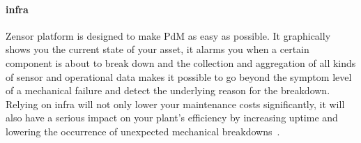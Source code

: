 \paragraph{\ac{infra}} 
Zensor platform is designed to make \ac{PdM} as easy as possible. It graphically shows you the current state of your asset, it alarms you when a certain component is about to
break down and the collection and aggregation of all kinds of sensor and operational data makes it possible to go beyond the symptom level of a mechanical failure 
and detect the underlying reason for the breakdown. Relying on \ac{infra} will not only lower your maintenance costs significantly, 
it will also have a serious impact on your plant’s efficiency by increasing uptime and lowering the occurrence of unexpected mechanical breakdowns~\cite{Misc:vaningelgem_2020_what}.

